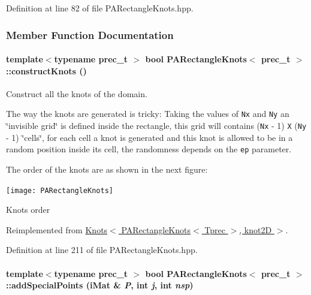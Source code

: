 Definition at line 82 of file PARectangleKnots.hpp.

\subsubsection{Member Function Documentation}
\hypertarget{classPARectangleKnots_3e8981078e760ca21870882bb3192846}{
\paragraph[{constructKnots}]{\setlength{\rightskip}{0pt plus 5cm}template$<$typename prec\_\-t $>$ bool {\bf PARectangleKnots}$<$ prec\_\-t $>$::constructKnots ()}\hfill}
\label{classPARectangleKnots_3e8981078e760ca21870882bb3192846}


Construct all the knots of the domain. 

The way the knots are generated is tricky: Taking the values of {\tt Nx} and {\tt Ny} an \char`\"{}invisible grid\char`\"{} is defined inside the rectangle, this grid will contains ({\tt Nx} - 1) {\tt X} ({\tt Ny} - 1) \char`\"{}cells\char`\"{}, for each cell a knot is generated and this knot is allowed to be in a random position inside its cell, the randomness depends on the {\tt ep} parameter.

The order of the knots are as shown in the next figure:  \begin{Image}
\begin{center}
\texttt{[image: PARectangleKnots]}\caption{Knots order}
\end{center}
\end{Image}
 

Reimplemented from \hyperlink{classKnots_8e622932aee837d4c3465093f3158ebb}{Knots$<$ PARectangleKnots$<$ Tprec $>$, knot2D $>$}.

Definition at line 211 of file PARectangleKnots.hpp.\hypertarget{classPARectangleKnots_62651b106b9813558bd5c715454100bd}{
\paragraph[{addSpecialPoints}]{\setlength{\rightskip}{0pt plus 5cm}template$<$typename prec\_\-t $>$ bool {\bf PARectangleKnots}$<$ prec\_\-t $>$::addSpecialPoints ({\bf iMat} \& {\em P}, \/  int {\em j}, \/  int {\em nsp})}\hfill}
\label{classPARectangleKnots_62651b106b9813558bd5c715454100bd}


